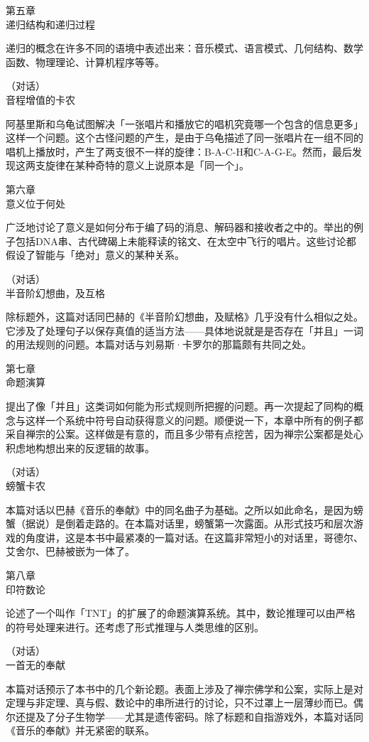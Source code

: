 \documentclass[
  12pt,
  twoside,
  openright,
  oldfontcommands,
]{memoir}
\begin{document}
第五章\\
{递归结构和递归过程}

递归的概念在许多不同的语境中表述出来：音乐模式、语言模式、几何结构、数学函数、物理理论、计算机程序等等。

（对话）\\
{音程增值的卡农}

阿基里斯和乌龟试图解决「一张唱片和播放它的唱机究竟哪一个包含的信息更多」这样一个问题。这个古怪问题的产生，是由于乌龟描述了同一张唱片在一组不同的唱机上播放时，产生了两支很不一样的旋律：B-A-C-H和C-A-G-E。然而，最后发现这两支旋律在某种奇特的意义上说原本是「同一个」。

第六章\\
{意义位于何处}

广泛地讨论了意义是如何分布于编了码的消息、解码器和接收者之中的。举出的例子包括DNA串、古代碑碣上未能释读的铭文、在太空中飞行的唱片。这些讨论都假设了智能与「绝对」意义的某种关系。

（对话）\\
{半音阶幻想曲，及互格}

除标题外，这篇对话同巴赫的《半音阶幻想曲，及赋格》几乎没有什么相似之处。它涉及了处理句子以保存真值的适当方法------具体地说就是是否存在「并且」一词的用法规则的问题。本篇对话与刘易斯·卡罗尔的那篇颇有共同之处。

第七章\\
{命题演算}

提出了像「并且」这类词如何能为形式规则所把握的问题。再一次提起了同构的概念与这样一个系统中符号自动获得意义的问题。顺便说一下，本章中所有的例子都采自禅宗的公案。这样做是有意的，而且多少带有点挖苦，因为禅宗公案都是处心积虑地构想出来的反逻辑的故事。

（对话）\\
{螃蟹卡农}

本篇对话以巴赫《音乐的奉献》中的同名曲子为基础。之所以如此命名，是因为螃蟹（据说）是倒着走路的。在本篇对话里，螃蟹第一次露面。从形式技巧和层次游戏的角度讲，这是本书中最紧凑的一篇对话。在这篇非常短小的对话里，哥德尔、艾舍尔、巴赫被嵌为一体了。

第八章\\
{印符数论}

论述了一个叫作「TNT」的扩展了的命题演算系统。其中，数论推理可以由严格的符号处理来进行。还考虑了形式推理与人类思维的区别。

（对话）\\
{一首无的奉献}

本篇对话预示了本书中的几个新论题。表面上涉及了禅宗佛学和公案，实际上是对定理与非定理、真与假、数论中的串所进行的讨论，只不过罩上一层薄纱而已。偶尔还提及了分子生物学------尤其是遗传密码。除了标题和自指游戏外，本篇对话同《音乐的奉献》并无紧密的联系。
\end{document}
